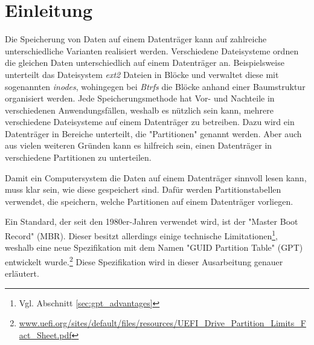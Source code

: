 \section{Einleitung}
Die Speicherung von Daten auf einem Datenträger kann auf zahlreiche unterschiedliche Varianten realisiert werden.
Verschiedene Dateisysteme ordnen die gleichen Daten unterschiedlich auf einem Datenträger an.
Beispielsweise unterteilt das Dateisystem \textit{ext2} Dateien in Blöcke und verwaltet diese mit sogenannten \textit{inodes}, wohingegen bei \textit{Btrfs} die Blöcke anhand einer Baumstruktur organisiert werden. 
Jede Speicherungsmethode hat Vor- und Nachteile in verschiedenen Anwendungsfällen, weshalb es nützlich sein kann, mehrere verschiedene Dateisysteme auf einem Datenträger zu betreiben.
Dazu wird ein Datenträger in Bereiche unterteilt, die "Partitionen" genannt werden.
Aber auch aus vielen weiteren Gründen kann es hilfreich sein, einen Datenträger in verschiedene Partitionen zu unterteilen.

Damit ein Computersystem die Daten auf einem Datenträger sinnvoll lesen kann, muss klar sein, wie diese gespeichert sind.
Dafür werden Partitionstabellen verwendet, die speichern, welche Partitionen auf einem Datenträger vorliegen.

Ein Standard, der seit den 1980er-Jahren verwendet wird, ist der "Master Boot Record" (MBR).
Dieser besitzt allerdings einige technische Limitationen\footnote{Vgl. Abschnitt \ref{sec:gpt_advantages}}, weshalb eine neue Spezifikation mit dem Namen "GUID Partition Table" (GPT) entwickelt wurde.\footnote{\url{www.uefi.org/sites/default/files/resources/UEFI_Drive_Partition_Limits_Fact_Sheet.pdf}}
Diese Spezifikation wird in dieser Ausarbeitung genauer erläutert.
